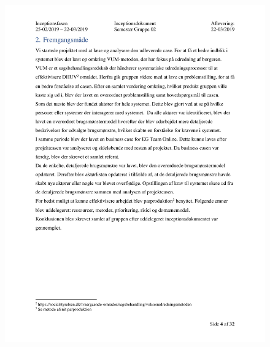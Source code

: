 \begin{figure}[hb]
  \includegraphics[scale = 0.33]{./PNG/Inceptions/Gruppe02+InceptionsDokument-05.jpg} 
\end{figure}

